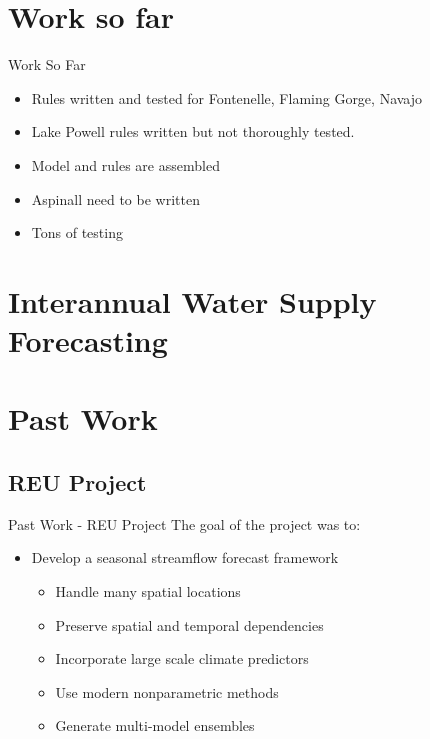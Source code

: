 \documentclass{beamer}
\begin{document}
\section{Work so far}
\begin{frame}{Work So Far}
\begin{itemize}
\item Rules written and tested for Fontenelle, Flaming Gorge, Navajo
\item Lake Powell rules written but not thoroughly tested.
\item Model and rules are assembled
\item Aspinall need to be written
\item Tons of testing
\end{itemize}
\end{frame}

\section{Interannual Water Supply Forecasting}

\section{Past Work}
\subsection{REU Project}
\begin{frame}{Past Work - REU Project}
\pause
The goal of the project was to: 
\begin{itemize}
  \item Develop a \alert{seasonal streamflow forecast framework}
\begin{itemize}

\item Handle many spatial locations 
\item Preserve spatial and temporal dependencies
\item Incorporate large scale climate predictors
\item Use modern nonparametric methods
\item Generate multi-model ensembles
\end{itemize}
\end{itemize}


\end{frame}
\end{document}
